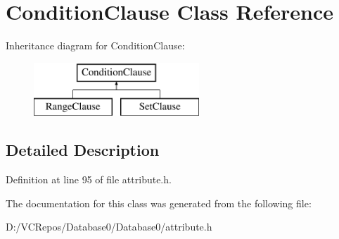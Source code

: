\hypertarget{class_condition_clause}{}\section{Condition\+Clause Class Reference}
\label{class_condition_clause}
Inheritance diagram for Condition\+Clause\+:\begin{figure}[H]
\begin{center}
\leavevmode
\includegraphics[height=2.000000cm]{class_condition_clause}
\end{center}
\end{figure}


\subsection{Detailed Description}


Definition at line 95 of file attribute.\+h.



The documentation for this class was generated from the following file\+:\begin{DoxyCompactItemize}
\item 
D\+:/\+V\+C\+Repos/\+Database0/\+Database0/attribute.\+h\end{DoxyCompactItemize}
